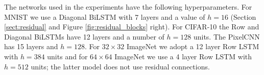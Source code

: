 The networks used in the experiments have the following hyperparameters. For MNIST we use a Diagonal BiLSTM with 7 layers and a value of $h=16$  (Section \ref{sect:residual} and Figure \ref{fig:residual_blocks} right). For CIFAR-10 the Row and Diagonal BiLSTMs have 12 layers and a number of $h=128$ units. The PixelCNN has 15 layers and $h=128$. For $32\times32$ ImageNet  we adopt a 12 layer Row LSTM with $h=384$ units and for $64\times64$ ImageNet we use a 4 layer Row LSTM with $h=512$ units; the latter model does not use residual connections. 
